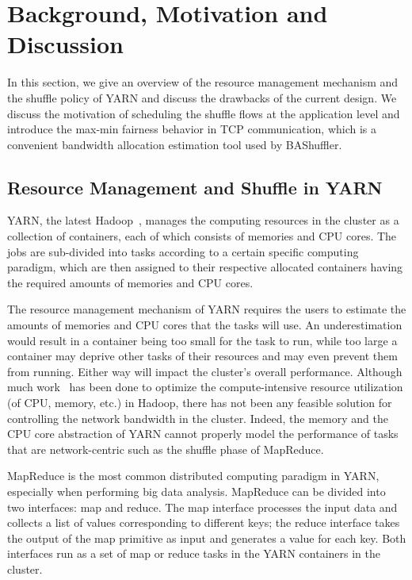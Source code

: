 \documentclass[10pt,journal,compsoc]{IEEEtran}
\begin{document}
\section{Background, Motivation and Discussion}\label{section:background}
In this section, we give an overview of the resource management mechanism
and the shuffle policy of YARN and discuss the drawbacks of the current design. 
We discuss the motivation of scheduling the shuffle flows at the application level
and introduce the max-min fairness behavior in TCP communication, which is
a convenient bandwidth allocation estimation tool used by BAShuffler. 

\subsection{Resource Management and Shuffle in YARN}

YARN, the latest Hadoop~\cite{white2015hadoop}, manages the computing resources in the cluster as a collection
of containers, each of which consists of memories and CPU cores. The
jobs are sub-divided into tasks according to a certain specific
computing paradigm, which are then assigned to their respective allocated
containers
having the required amounts of memories and CPU cores.

 
The resource management mechanism of YARN requires the users to
estimate the amounts of memories and CPU cores that the tasks will use.
An underestimation would result in a container being too small for the task
to run, while too large a container may deprive other tasks of their
resources and may even prevent them from running. Either way
will impact the cluster's overall performance. 
Although much work~\cite{Delimitrou:2014:QRQ, smapreduce} has been done to optimize the compute-intensive
resource utilization (of CPU, memory, etc.) in
Hadoop, there has not been any
feasible solution for controlling the network bandwidth in the
cluster.
Indeed,
the memory and the CPU core abstraction of YARN cannot properly model the
performance of tasks that are network-centric such as
the shuffle phase of MapReduce. 
 
MapReduce is the most common distributed computing paradigm in YARN,
especially when performing big data analysis. MapReduce can be divided
into two interfaces: map and reduce.
The map interface processes the input data and collects a list of
values corresponding to different keys;
the reduce interface takes the output of the map primitive as
input and generates a value for each key.
Both interfaces run as a set of map or reduce tasks in the YARN
containers in the cluster.
\end{document}
